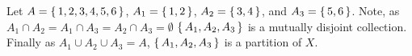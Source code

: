 \guard




\begin{exmp}
\label{exmp:easyParitions}
  Let $A=\left\{\, 1,2,3,4,5,6\,\right\}$, $A_1 = \left\{\,1,2\,\right\}$, $A_2=\left\{\,3,4\,\right\}$, and $A_3=\left\{\,5,6\,\right\}$.
    Note, as $A_1\cap A_2=A_1\cap A_3=A_2\cap A_3=\emptyset$ $\left\{\,A_1,A_2,A_3\,\right\}$ is a mutually disjoint collection.
    Finally as $A_1\cup A_2\cup A_3 = A$, $\left\{\,A_1,A_2,A_3\,\right\}$ is a partition of $X$.
\end{exmp}
